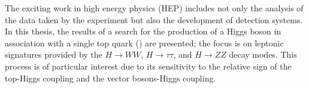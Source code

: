 \footnotesize
The exciting work in high energy physics (HEP) includes not only the analysis of the data taken by the experiment but also the development of detection systems. In this thesis, the results of a search for the production of a Higgs boson in association with a single top quark (\tH) are presented; the focus is on leptonic signatures provided by the $H \to WW$, $H \to \tau\tau$, and $H \to ZZ$ decay modes. This process is of particular interest due to its sensitivity to the relative sign of the top-Higgs coupling and the vector bosons-Higgs coupling.





